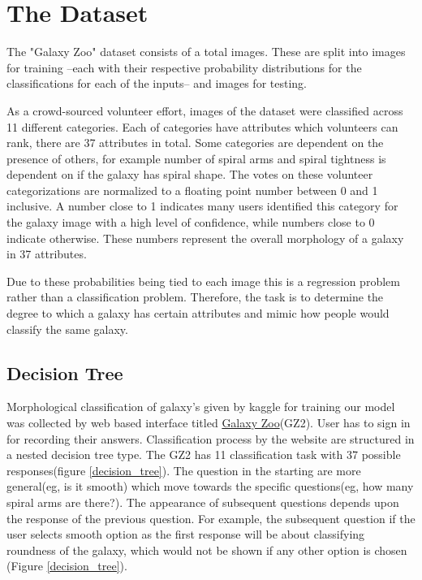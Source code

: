 \section{The Dataset}

The "Galaxy Zoo" dataset consists of a total  images. These are split into  images for training --each with their respective probability distributions for the classifications for each of the inputs-- and  images for testing.

As a crowd-sourced volunteer effort, images of the dataset were classified across 11 different categories. Each of categories have attributes which volunteers can rank, there are 37 attributes in total. Some categories are dependent on the presence of others, for example number of spiral arms and spiral tightness is dependent on if the galaxy has spiral shape. The votes on these volunteer categorizations are normalized to a floating point number between 0 and 1 inclusive. A number close to 1 indicates many users identified this category for the galaxy image with a high level of confidence, while numbers close to 0 indicate otherwise. These numbers represent the overall morphology of a galaxy in 37 attributes.

Due to these probabilities being tied to each image this is a regression problem rather than a classification problem. Therefore, the task is to determine the degree to which a galaxy has certain attributes and mimic how people would classify the same galaxy.

\subsection{Decision Tree}

Morphological classification of galaxy's given by kaggle for training our model was collected by web based interface titled \href{https://www.zooniverse.org/projects/zookeeper/galaxy-zoo/classify}{Galaxy Zoo}(GZ2). User has to sign in for recording their answers. Classification process by the website are structured in a nested decision tree type. The GZ2 has 11 classification task with 37 possible responses(figure \ref{decision_tree}). The question in the starting are more general(eg, is it smooth) which move towards the specific questions(eg, how many spiral arms are there?). The appearance of subsequent questions depends upon the response of the previous question. For example, the subsequent question if the user selects smooth option as the first response will be about classifying roundness of the galaxy, which would not be shown if any other option is chosen (Figure \ref{decision_tree}).

